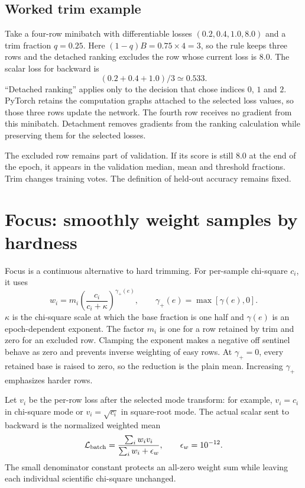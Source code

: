 \documentclass[10pt,aps,prd,twocolumn,nofootinbib]{revtex4-2}
\begin{document}
\subsection*{Worked trim example}

Take a four-row minibatch with differentiable losses
$(0.2,0.4,1.0,8.0)$ and a trim fraction $q=0.25$.  Here
$(1-q)B=0.75\times4=3$, so the rule keeps three rows and the detached ranking
excludes the row whose current
loss is $8.0$.  The scalar loss for backward is
\begin{equation*}
  (0.2+0.4+1.0)/3\simeq0.533.
\end{equation*}
``Detached ranking'' applies only to the decision that chose indices $0$, $1$
and $2$.  PyTorch retains the computation graphs attached to the selected loss values, so those three
rows update the network.  The fourth row receives no gradient from this
minibatch.  Detachment removes gradients from the ranking calculation while
preserving them for the selected losses.

The excluded row remains part of validation.  If its score is still $8.0$ at
the end of the epoch, it appears in the validation median, mean and threshold
fractions.  Trim changes training votes.  The definition of held-out accuracy
remains fixed.

\section{Focus: smoothly weight samples by hardness}
\label{sec:focus}

Focus is a continuous alternative to hard trimming.  For per-sample
chi-square \(c_i\), it uses
\begin{equation}
 w_i=m_i\left(\frac{c_i}{c_i+\kappa}\right)^{\gamma_+(e)},
 \qquad \gamma_+(e)=\max[\gamma(e),0].
 \label{eq:focus}
\end{equation}
\(\kappa\) is the chi-square scale at which the base fraction is one half and
\(\gamma(e)\) is an epoch-dependent exponent.  The factor $m_i$ is one for a
row retained by trim and zero for an excluded row.  Clamping the exponent
makes a negative off sentinel behave as zero and prevents inverse weighting
of easy rows.  At \(\gamma_+=0\), every retained base is raised to zero, so the
reduction is the plain mean.  Increasing \(\gamma_+\) emphasizes harder rows.

Let $v_i$ be the per-row loss after the selected mode transform: for example,
$v_i=c_i$ in chi-square mode or $v_i=\sqrt{c_i}$ in square-root mode.  The
actual scalar sent to backward is the normalized weighted mean
\begin{equation}
 \mathcal L_{\rm batch}
 =\frac{\sum_iw_iv_i}{\sum_iw_i+\epsilon_w},
 \qquad \epsilon_w=10^{-12}.
 \label{eq:focus-reduction}
\end{equation}
The small denominator constant protects an all-zero weight sum while leaving
each individual scientific chi-square unchanged.
\end{document}

